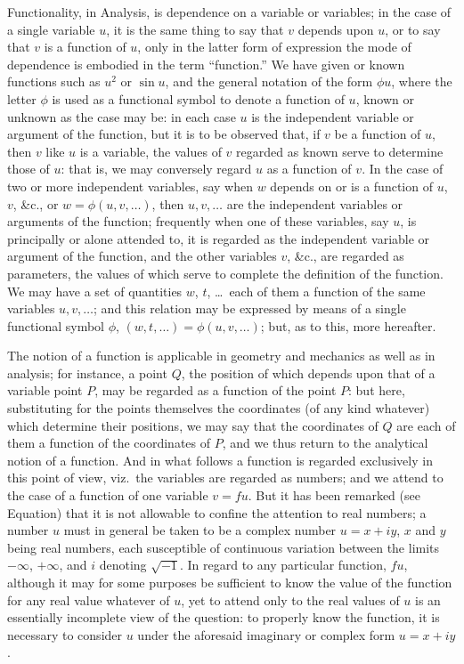 \documentclass[11pt,a4paper]{article}
\begin{document}
Functionality, in Analysis, is dependence on a variable or variables; in the case of a single variable $u$, it is the same thing to say that $v$ depends upon $u$, or to say that $v$ is a function of $u$, only in the latter form of expression the mode of dependence is embodied in the term ``function.'' We have given or known functions such as $u^{2}$ or $\sin u$, and the general notation of the form $\phi u$, where the letter $\phi$ is used as a functional symbol to denote a function of $u$, known or unknown as the case may be: in each case $u$ is the independent variable or argument of the function, but it is to be observed that, if $v$ be a function of $u$, then $v$ like $u$ is a variable, the values of $v$ regarded as known serve to determine those of $u$: that is, we may conversely regard $u$ as a function of $v$. In the case of two or more independent variables, say when $w$ depends on or is a function of $u$, $v$, \&c., or $w = \phi(u, v, \ldots)$, then $u, v, \ldots$ are the independent variables or arguments of the function; frequently when one of these variables, say $u$, is principally or alone attended to, it is regarded as the independent variable or argument of the function, and the other variables $v$, \&c., are regarded as parameters, the values of which serve to complete the definition of the function. We may have a set of quantities $w$, $t$, \ldots\ each of them a function of the same variables $u, v, \ldots$; and this relation may be expressed by means of a single functional symbol $\phi$, $(w, t, \ldots) = \phi(u, v, \ldots)$; but, as to this, more hereafter.

The notion of a function is applicable in geometry and mechanics as well as in analysis; for instance, a point $Q$, the position of which depends upon that of a variable point $P$, may be regarded as a function of the point $P$: but here, substituting for the points themselves the coordinates (of any kind whatever) which determine their positions, we may say that the coordinates of $Q$ are each of them a function of the coordinates of $P$, and we thus return to the analytical notion of a function. And in what follows a function is regarded exclusively in this point of view, viz.\ the variables are regarded as numbers; and we attend to the case of a function of one variable $v = f u$. But it has been remarked (see Equation) that it is not allowable to confine the attention to real numbers; a number $u$ must in general be taken to be a complex number $u = x + iy$, $x$ and $y$ being real numbers, each susceptible of continuous variation between the limits $-\infty$, $+\infty$, and $i$ denoting $\sqrt{-1}$. In regard to any particular function, $fu$, although it may for some purposes be sufficient to know the value of the function for any real value whatever of $u$, yet to attend only to the real values of $u$ is an essentially incomplete view of the question: to properly know the function, it is necessary to consider $u$ under the aforesaid imaginary or complex form $u = x + iy$.
\end{document}
